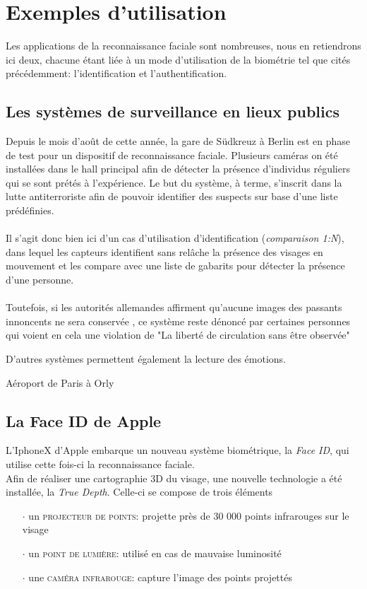 \section{Exemples d'utilisation}
Les applications de la reconnaissance faciale sont nombreuses, nous en retiendrons ici deux, chacune étant liée à un mode d'utilisation de la biométrie tel que cités précédemment: l'identification et l'authentification.
\subsection{Les systèmes de surveillance en lieux publics}
Depuis le mois d'août de cette année, la gare de Südkreuz à Berlin est en phase de test pour un dispositif de reconnaissance faciale. Plusieurs caméras on été installées dans le hall principal afin de détecter la présence d'individus réguliers qui se sont prétés à l'expérience. Le but du système, à terme, s'inscrit dans la lutte antiterroriste afin de pouvoir identifier des suspects sur base d'une liste prédéfinies.
\paragraph{}
Il s'agit donc bien ici d'un cas d'utilisation d'identification (\textit{comparaison 1:N}), dans lequel les capteurs identifient sans relâche la présence des visages en mouvement et les compare avec une liste de gabarits pour détecter la présence d'une personne.
\paragraph{}
Toutefois, si les autorités allemandes affirment qu'aucune images des passants innoncents ne sera conservée \cite{Xmisc_6}, ce système reste dénoncé par certaines personnes qui voient en cela une violation de "La liberté de circulation sans être observée"

D'autres systèmes permettent également la lecture des émotions.

Aéroport de Paris à Orly

\subsection{La Face ID de Apple}
L'IphoneX d'Apple embarque un nouveau système biométrique, la \textit{Face ID}, qui utilise cette fois-ci la reconnaissance faciale.
\\Afin de réaliser une cartographie 3D du visage, une nouvelle technologie a été installée, la \textit{True Depth}. Celle-ci se compose de trois éléments \cite{Xmisc_4}
\begin{itemize}
\item[$\cdot$]un \textsc{projecteur de points}: projette près de 30 000 points infrarouges sur le visage
\item[$\cdot$]un \textsc{point de lumière}: utilisé en cas de mauvaise luminosité
\item[$\cdot$]une \textsc{caméra infrarouge}: capture l'image des points projettés
\end{itemize}
